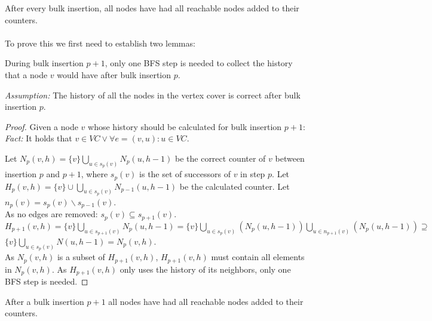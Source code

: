 \begin{theorem} After every bulk insertion, all nodes have had all reachable nodes added to their counters. \\\\
To prove this we first need to establish two lemmas:\\

\begin{lemma} During bulk insertion $p+1$, only one BFS step is needed to collect the history that a node $v$ would have after bulk insertion $p$. \\\label{lemma:partial_history_calculation}

\noindent\textit{Assumption:} The history of all the nodes in the vertex cover is correct after bulk insertion $p$.

\begin{proof} Given a node $v$ whose history should be calculated for bulk insertion $p+1$:\\

\noindent\textit{Fact:} It holds that $v \in VC \vee \forall e = (v,u) : u \in VC$.

\noindent Let $N_p(v,h) = \{v\}\bigcup\limits_{u \in s_p(v)} N_p(u,h-1) $ be the correct counter of $v$ between insertion $p$ and $p+1$, where $s_p(v)$ is the set of successors of $v$ in step $p$. Let $H_p(v,h) = \{v\}\cup\bigcup\limits_{u\in s_{p}(v)}N_{p-1}(u,h-1)$ be the calculated counter. Let $n_p(v)=s_p(v)\backslash s_{p-1}(v)$.\\


\noindent As no edges are removed: 
$s_p(v) \subseteq s_{p+1}(v)$.\\ 
$H_{p+1}(v,h) = \{v\}\bigcup\limits_{u\in s_{p+1}(v)}N_{p}(u,h-1) = \{v\}\bigcup\limits_{u\in s_{p}(v)}(N_{p}(u,h-1)) \bigcup\limits_{u\in n_{p+1}(v)}(N_{p}(u,h-1)) \supseteq $\\ $\{v\}\bigcup\limits_{u \in s_p(v)} N(u,h-1) = N_p(v,h)$. \\

\noindent As $N_p(v,h)$ is a subset of $H_{p+1}(v,h)$, $H_{p+1}(v,h)$ must contain all elements in $N_p(v,h)$. As $H_{p+1}(v,h)$ only uses the history of its neighbors, only one BFS step is needed. 

\end{proof} 
\end{lemma}

\begin{lemma} After a bulk insertion $p+1$ all nodes have had all reachable nodes added to their counters.\\
\label{lemma:propagation}


\end{lemma}
\end{theorem}
